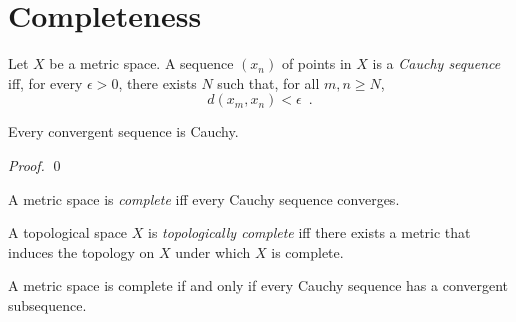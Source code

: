 \section{Completeness}

\begin{df}
  Let $X$ be a metric space. A sequence $(x_n)$ of points in $X$ is a \emph{Cauchy sequence} iff, for every $\epsilon > 0$, there exists $N$ such that, for all $m, n \geq N$,
  \[ d(x_m, x_n) < \epsilon \enspace . \]
\end{df}

\begin{lm}
  \label{lm:topology:metric:convergent_cauchy}
  Every convergent sequence is Cauchy.
\end{lm}

\begin{proof}
  \pf
  \qed
\end{proof}

\begin{df}[Complete]
  A metric space is \emph{complete} iff every Cauchy sequence converges.
\end{df}

\begin{df}
  A topological space $X$ is \emph{topologically complete} iff there exists a metric that induces the topology on $X$ under which $X$ is complete.
\end{df}

\begin{lm}
  \label{lm:topology:metric:complete}
  A metric space is complete if and only if every Cauchy sequence has a convergent subsequence.
\end{lm}

